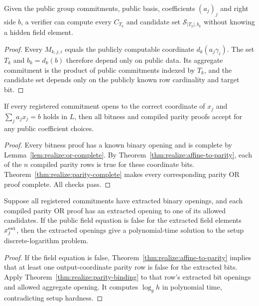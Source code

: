 \begin{lemma}\label{lem:realize:rows-public}
Given the public group commitments, public
basis, coefficients $(a_j)_j$ and right side $b$,
a verifier can compute every $C_{T_k}$ and
candidate set $\mathcal S_{|T_k|,b_k}$
without knowing a hidden field element.
\end{lemma}
\begin{proof}
Every $M_{k,j,i}$ equals the publicly
computable coordinate $d_k(a_j\gamma_i)$.
The set $T_k$ and $b_k=d_k(b)$ therefore
depend only on public data. Its aggregate
commitment is the product of public
commitments indexed by $T_k$, and the
candidate set depends only on the publicly
known row cardinality and target bit.
\end{proof}

\begin{theorem}\label{thm:realize:compiler-complete}
If every registered commitment opens to the correct
coordinate of $x_j$ and
$\sum_ja_jx_j=b$ holds in $L$, then
all bitness and compiled parity proofs
accept for any public coefficient choices.
\end{theorem}
\begin{proof}
Every bitness proof has a known binary opening
and is complete by
Lemma~\ref{lem:realize:or-complete}.
By Theorem~\ref{thm:realize:affine-to-parity},
each of the $n$ compiled parity rows
is true for these coordinate bits.
Theorem~\ref{thm:realize:parity-complete}
makes every corresponding parity
OR proof complete. All checks pass.
\end{proof}

\begin{theorem}\label{thm:realize:compiler-extract}
Suppose all registered commitments have
extracted binary openings, and each compiled
parity OR proof has an extracted opening
to one of its allowed candidates.
If the public field equation is false for
the extracted field elements
$x_j^{\rm ext}$, then the extracted openings
give a polynomial-time solution to the
setup discrete-logarithm problem.
\end{theorem}
\begin{proof}
If the field equation is false,
Theorem~\ref{thm:realize:affine-to-parity}
implies that at least one output-coordinate
parity row is false for the extracted bits.
Apply
Theorem~\ref{thm:realize:parity-binding}
to that row's extracted bit openings
and allowed aggregate opening.
It computes $\log_g h$ in polynomial time,
contradicting setup hardness.
\end{proof}

